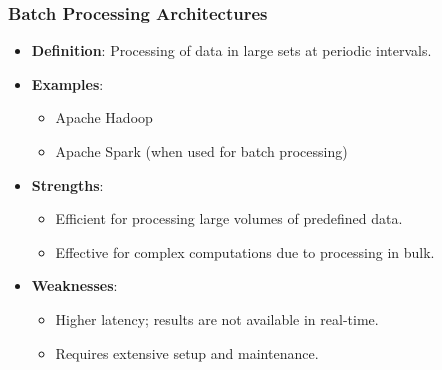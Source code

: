 \documentclass[aspectratio=169]{beamer}
\begin{document}
\begin{frame}[fragile]
    \frametitle{Batch Processing Architectures}
    \begin{itemize}
        \item \textbf{Definition}: Processing of data in large sets at periodic intervals.
        \item \textbf{Examples}: 
            \begin{itemize}
                \item Apache Hadoop
                \item Apache Spark (when used for batch processing)
            \end{itemize}
        \item \textbf{Strengths}:
            \begin{itemize}
                \item Efficient for processing large volumes of predefined data.
                \item Effective for complex computations due to processing in bulk.
            \end{itemize}
        \item \textbf{Weaknesses}:
            \begin{itemize}
                \item Higher latency; results are not available in real-time.
                \item Requires extensive setup and maintenance.
            \end{itemize}
    \end{itemize}
\end{frame}
\end{document}
